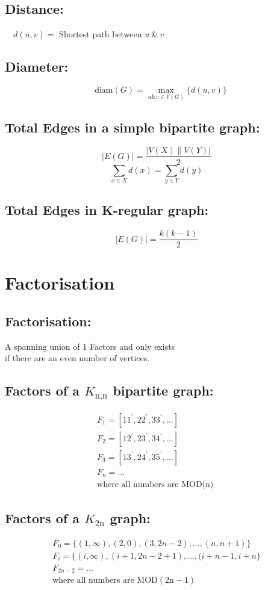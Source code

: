\documentclass[../../mathematics_cheat_sheet.tex]{subfiles}
\begin{document}
\subsection{Distance:}
\begin{center}
  $\quad d(u, v)=$ Shortest path between $u ~\&~ v$
\end{center}
%
\subsection{Diameter:}
\[\quad \text{diam}(G)=\max _{u \& v \in V(G)}\{d(u, v)\}\]
%
\subsection{Total Edges in a simple bipartite graph:}
\[|E(G)|=\frac{|V(X) \| V(Y)|}{2} \]
\[\sum_{x \in X} d(x)=\sum_{y \in Y} d(y)\]
%
\subsection{Total Edges in K-regular graph:}
\[|E(G)|=\frac{k(k-1)}{2}\]
%
\section{Factorisation}
%
\subsection{Factorisation:}
\begin{center}
  A spanning union of 1 Factors and only exists\\ if there are an even number of vertices.
\end{center}
%
\subsection{Factors of a $K_\text{n,n}$ bipartite graph:}
\[
  \begin{array}{l}
    F_{1}=\left[11^{\prime}, 22^{\prime}, 33^{\prime}, \ldots\right]\\
    F_{2}=\left[12^{\prime}, 23^{\prime}, 34^{\prime}, \ldots\right]\\
    F_{3}=\left[13^{\prime}, 24^{\prime}, 35^{\prime}, \ldots\right]\\
    F_{n}=\ldots\\
    \text{where all numbers are MOD(n) }
  \end{array}
\]
%
\subsection{Factors of a $K_\text{2n}$ graph:}
\[
  \begin{array}{l}
    F_{0}=\{(1, \infty),(2,0),(3,2 n-2), \ldots,(n, n+1)\}\\
    F_{i}=\{(i, \infty),(i+1,2 n-2+1), \ldots,(i+n-1, i+n\}\\
    F_{2 n-2}=\ldots\\
    \text{where all numbers are } \mathrm{MOD}(2 \mathrm{n}-1)
  \end{array}
\]
%
%
\end{document}
